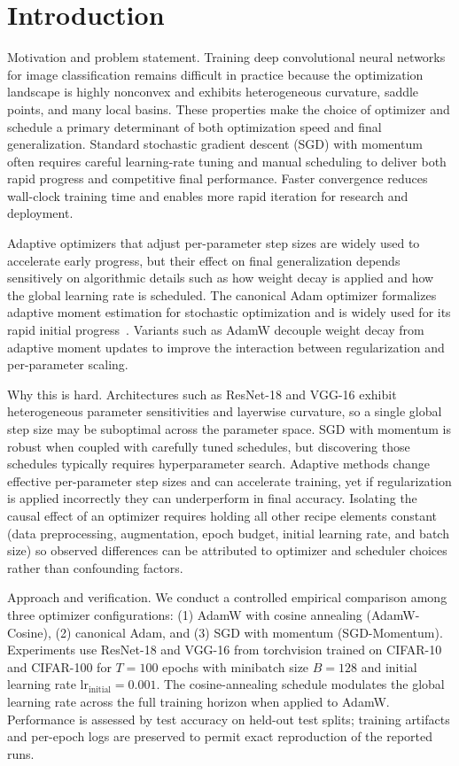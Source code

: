 \documentclass[journal,article,submit,pdftex,moreauthors]{Definitions/mdpi}
\begin{document}
\section{Introduction}

Motivation and problem statement. Training deep convolutional neural networks for image classification remains difficult in practice because the optimization landscape is highly nonconvex and exhibits heterogeneous curvature, saddle points, and many local basins. These properties make the choice of optimizer and schedule a primary determinant of both optimization speed and final generalization. Standard stochastic gradient descent (SGD) with momentum often requires careful learning-rate tuning and manual scheduling to deliver both rapid progress and competitive final performance. Faster convergence reduces wall-clock training time and enables more rapid iteration for research and deployment.

Adaptive optimizers that adjust per-parameter step sizes are widely used to accelerate early progress, but their effect on final generalization depends sensitively on algorithmic details such as how weight decay is applied and how the global learning rate is scheduled. The canonical Adam optimizer formalizes adaptive moment estimation for stochastic optimization and is widely used for its rapid initial progress~\cite{kingma-2014-adam}. Variants such as AdamW decouple weight decay from adaptive moment updates to improve the interaction between regularization and per-parameter scaling.

Why this is hard. Architectures such as ResNet-18 and VGG-16 exhibit heterogeneous parameter sensitivities and layerwise curvature, so a single global step size may be suboptimal across the parameter space. SGD with momentum is robust when coupled with carefully tuned schedules, but discovering those schedules typically requires hyperparameter search. Adaptive methods change effective per-parameter step sizes and can accelerate training, yet if regularization is applied incorrectly they can underperform in final accuracy. Isolating the causal effect of an optimizer requires holding all other recipe elements constant (data preprocessing, augmentation, epoch budget, initial learning rate, and batch size) so observed differences can be attributed to optimizer and scheduler choices rather than confounding factors.

Approach and verification. We conduct a controlled empirical comparison among three optimizer configurations: (1) AdamW with cosine annealing (AdamW-Cosine), (2) canonical Adam, and (3) SGD with momentum (SGD-Momentum). Experiments use ResNet-18 and VGG-16 from torchvision trained on CIFAR-10 and CIFAR-100 for $T = 100$ epochs with minibatch size $B = 128$ and initial learning rate $\mathrm{lr}_{\mathrm{initial}} = 0.001$. The cosine-annealing schedule modulates the global learning rate across the full training horizon when applied to AdamW. Performance is assessed by test accuracy on held-out test splits; training artifacts and per-epoch logs are preserved to permit exact reproduction of the reported runs.
\end{document}
